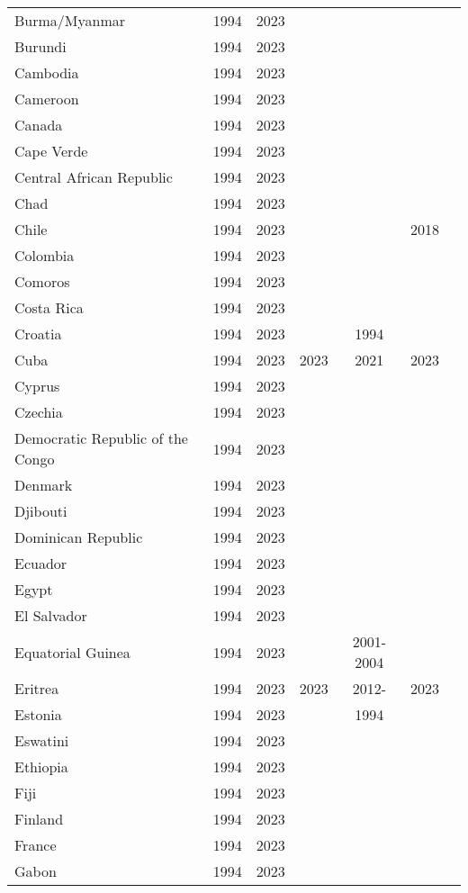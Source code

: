 {\begin{longtable}{lcccccc}
Burma/Myanmar & 1994 & 2023 &  &  &  & \\
Burundi & 1994 & 2023 &  &  &  & \\
Cambodia & 1994 & 2023 &  &  &  & \\
\addlinespace
Cameroon & 1994 & 2023 &  &  &  & \\
Canada & 1994 & 2023 &  &  &  & \\
Cape Verde & 1994 & 2023 &  &  &  & \\
Central African Republic & 1994 & 2023 &  &  &  & \\
Chad & 1994 & 2023 &  &  &  & \\
\addlinespace
Chile & 1994 & 2023 &  &  & 2018 & \\
Colombia & 1994 & 2023 &  &  &  & \\
Comoros & 1994 & 2023 &  &  &  & \\
Costa Rica & 1994 & 2023 &  &  &  & \\
Croatia & 1994 & 2023 &  & 1994 &  & \\
\addlinespace
Cuba & 1994 & 2023 & 2023 & 2021 & 2023 & \\
Cyprus & 1994 & 2023 &  &  &  & \\
Czechia & 1994 & 2023 &  &  &  & \\
Democratic Republic of the Congo & 1994 & 2023 &  &  &  & \\
Denmark & 1994 & 2023 &  &  &  & \\
\addlinespace
Djibouti & 1994 & 2023 &  &  &  & \\
Dominican Republic & 1994 & 2023 &  &  &  & \\
Ecuador & 1994 & 2023 &  &  &  & \\
Egypt & 1994 & 2023 &  &  &  & \\
El Salvador & 1994 & 2023 &  &  &  & \\
\addlinespace
Equatorial Guinea & 1994 & 2023 &  & 2001-2004 &  & \\
Eritrea & 1994 & 2023 & 2023 & 2012- & 2023 & \\
Estonia & 1994 & 2023 &  & 1994 &  & \\
Eswatini & 1994 & 2023 &  &  &  & \\
Ethiopia & 1994 & 2023 &  &  &  & \\
\addlinespace
Fiji & 1994 & 2023 &  &  &  & \\
Finland & 1994 & 2023 &  &  &  & \\
France & 1994 & 2023 &  &  &  & \\
Gabon & 1994 & 2023 &  &  &  & \\

\end{longtable}}
